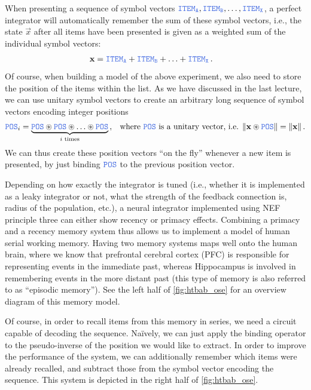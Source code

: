 \documentclass[10pt,letterpaper,oneside]{article}
\newcommand{\Obj}[1]{\ensuremath{\mathtt{\textcolor{RoyalBlue}{#1}}}}
\newcommand{\CC}{\circledast}
\begin{document}
When presenting a sequence of symbol vectors $\Obj{ITEM_A}, \Obj{ITEM_B}, \ldots, \Obj{ITEM_X}$, a perfect integrator will automatically remember the sum of these symbol vectors, i.e., the state $\vec x$ after all items have been presented is given as a weighted sum of the individual symbol vectors:
\begin{align*}
	\vec x &= \Obj{ITEM_A} + \Obj{ITEM_B} + \ldots + \Obj{ITEM_X} \,.
\end{align*}
Of course, when building a model of the above experiment, we also need to store the position of the items within the list. As we have discussed in the last lecture, we can use unitary symbol vectors to create an arbitrary long sequence of symbol vectors encoding integer positions
\begin{align*}
	\Obj{POS}_i &= \underbrace{\Obj{POS} \CC \Obj{POS} \CC \ldots \CC \Obj{POS}}_{i \text{ times}} \,, & \text{where } \Obj{POS} \text { is a unitary vector, i.e. } \| \vec x \CC \Obj{POS} \| = \| \vec x \| \,.
\end{align*}
We can thus create these position vectors \enquote{on the fly} whenever a new item is presented, by just binding \Obj{POS} to the previous position vector.

Depending on how exactly the integrator is tuned (i.e., whether it is implemented as a leaky integrator or not, what the strength of the feedback connection is, radius of the population, etc.), a neural integrator implemented using NEF principle three can either show recency or primacy effects. Combining a primacy and a recency memory system thus allows us to implement a model of human serial working memory. Having two memory systems maps well onto the human brain, where we know that prefrontal cerebral cortex (PFC) is responsible for representing events in the immediate past, whereas Hippocampus is involved in remembering events in the more distant past (this type of memory is also referred to as \enquote{episodic memory}). See the left half of \cref{fig:htbab_ose} for an overview diagram of this memory model.

Of course, in order to recall items from this memory in series, we need a circuit capable of decoding the sequence. Na\"ively, we can just apply the binding operator to the pseudo-inverse of the position we would like to extract. In order to improve the performance of the system, we can additionally  remember which items were already recalled, and subtract those from the symbol vector encoding the sequence. This system is depicted in the right half of \cref{fig:htbab_ose}.
\end{document}
